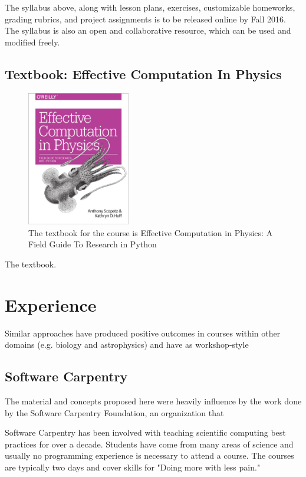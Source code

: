 \documentclass{anstrans}
\begin{document}
The syllabus above, along with lesson plans, exercises, customizable homeworks,
grading rubrics, and project assignments is to be released online by Fall 2016.
The syllabus is also an open and collaborative resource, which can be used
and modified freely.

\subsection{Textbook: Effective Computation In Physics}

\begin{figure}[htbp!]
\begin{center}
\includegraphics[width=0.4\textwidth]{ecip.eps}
\end{center}
\caption{The textbook for the course is Effective Computation in Physics: A Field Guide To Research in Python}
\label{fig:book}
\end{figure}

The textbook.


\section{Experience}

Similar approaches have produced positive outcomes in courses within other domains
(e.g. biology \cite{} and astrophysics\cite{}) and have  as workshop-style  \cite{thw_ans, swc}

\subsection{Software Carpentry}

The material and concepts proposed here were heavily influence by the work done
by the Software Carpentry Foundation, an organization that

Software Carpentry has been involved with teaching scientific computing best
practices for over a decade. Students have come from many areas of science and
usually no programming experience is necessary to attend a course. The courses
are typically two days and cover skills for "Doing more with less pain."
\end{document}
